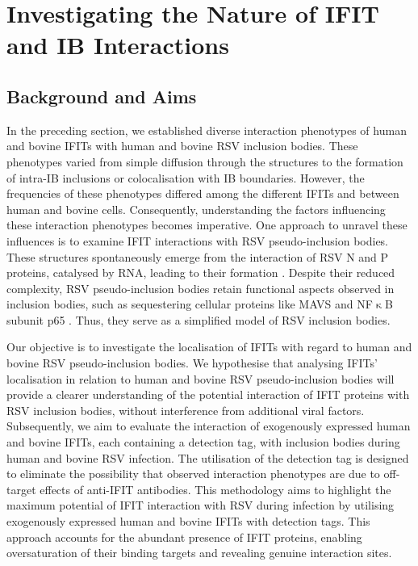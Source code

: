 \chapter{Investigating the Nature of IFIT and IB Interactions} \label{ch:Investigating the Nature of IFIT and IB Interactions}
\section{Background and Aims} \label{sec:Background and Aims-Chapter4}
In the preceding section, we established diverse interaction phenotypes of human and bovine IFITs with human and bovine RSV inclusion bodies. These phenotypes varied from simple diffusion through the structures to the formation of intra-IB inclusions or colocalisation with IB boundaries. However, the frequencies of these phenotypes differed among the different IFITs and between human and bovine cells. Consequently, understanding the factors influencing these interaction phenotypes becomes imperative. One approach to unravel these influences is to examine IFIT interactions with RSV pseudo-inclusion bodies. These structures spontaneously emerge from the interaction of RSV N and P proteins, catalysed by RNA, leading to their formation \cite{Rincheval2017FunctionalVirus, Galloux2020MinimalVitro}. Despite their reduced complexity, RSV pseudo-inclusion bodies retain functional aspects observed in inclusion bodies, such as sequestering cellular proteins like MAVS and NF$\upkappa$B subunit p65 \cite{Rincheval2017FunctionalVirus, Jobe2023ViralCondensates}. Thus, they serve as a simplified model of RSV inclusion bodies.

Our objective is to investigate the localisation of IFITs with regard to human and bovine RSV pseudo-inclusion bodies. We hypothesise that analysing IFITs' localisation in relation to human and bovine RSV pseudo-inclusion bodies will provide a clearer understanding of the potential interaction of IFIT proteins with RSV inclusion bodies, without interference from additional viral factors. Subsequently, we aim to evaluate the interaction of exogenously expressed human and bovine IFITs, each containing a detection tag, with inclusion bodies during human and bovine RSV infection. The utilisation of the detection tag is designed to eliminate the possibility that observed interaction phenotypes are due to off-target effects of anti-IFIT antibodies. This methodology aims to highlight the maximum potential of IFIT interaction with RSV during infection by utilising exogenously expressed human and bovine IFITs with detection tags. This approach accounts for the abundant presence of IFIT proteins, enabling oversaturation of their binding targets and revealing genuine interaction sites.

